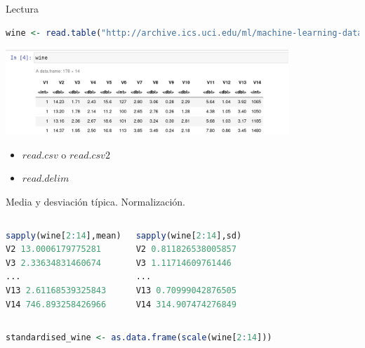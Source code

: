 \documentclass[xcolor=table]{beamer}
\begin{document}
\begin{frame}[fragile]{Lectura}



\begin{lstlisting}[language=R, basicstyle=\ttfamily]
wine <- read.table("http://archive.ics.uci.edu/ml/machine-learning-databases/wine/wine.data",sep=",")
\end{lstlisting}
\centering
\includegraphics[width=0.8\textwidth]{dataframe_wine.png}

\begin{itemize}
\item $read.csv$ o $read.csv2$
\item $read.delim$
\end{itemize}
\end{frame}



\begin{frame}[fragile]{Media y desviación típica. Normalización.}
    \begin{columns}[c] %
     \begin{lstlisting}[language=R, basicstyle=\ttfamily]
sapply(wine[2:14],mean)
V2 13.0006179775281
V3 2.33634831460674
...
V13 2.61168539325843
V14 746.893258426966 
\end{lstlisting}
     \begin{lstlisting}[language=R, basicstyle=\ttfamily]
sapply(wine[2:14],sd)
V2 0.811826538005857
V3 1.11714609761446
...
V13 0.70999042876505
V14 314.907474276849
\end{lstlisting}



    \end{columns}
    \begin{lstlisting}[language=R, basicstyle=\ttfamily]
    standardised_wine <- as.data.frame(scale(wine[2:14]))
\end{lstlisting}
\end{frame}
\end{document}
